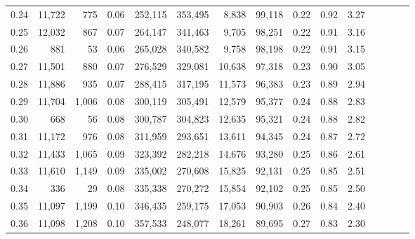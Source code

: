 \begin{tabular}{rrrcrrrrrrrrrrr}
0.24 &  11,722 &     775 &                                       0.06 &  252,115 &  353,495 &    8,838 &   99,118 &  0.22 &  0.92 &                         3.27 \\
0.25 &  12,032 &     867 &                                       0.07 &  264,147 &  341,463 &    9,705 &   98,251 &  0.22 &  0.91 &                         3.16 \\
0.26 &     881 &      53 &                                       0.06 &  265,028 &  340,582 &    9,758 &   98,198 &  0.22 &  0.91 &                         3.15 \\
0.27 &  11,501 &     880 &                                       0.07 &  276,529 &  329,081 &   10,638 &   97,318 &  0.23 &  0.90 &                         3.05 \\
0.28 &  11,886 &     935 &                                       0.07 &  288,415 &  317,195 &   11,573 &   96,383 &  0.23 &  0.89 &                         2.94 \\
0.29 &  11,704 &   1,006 &                                       0.08 &  300,119 &  305,491 &   12,579 &   95,377 &  0.24 &  0.88 &                         2.83 \\
0.30 &     668 &      56 &                                       0.08 &  300,787 &  304,823 &   12,635 &   95,321 &  0.24 &  0.88 &                         2.82 \\
0.31 &  11,172 &     976 &                                       0.08 &  311,959 &  293,651 &   13,611 &   94,345 &  0.24 &  0.87 &                         2.72 \\
0.32 &  11,433 &   1,065 &                                       0.09 &  323,392 &  282,218 &   14,676 &   93,280 &  0.25 &  0.86 &                         2.61 \\
0.33 &  11,610 &   1,149 &                                       0.09 &  335,002 &  270,608 &   15,825 &   92,131 &  0.25 &  0.85 &                         2.51 \\
0.34 &     336 &      29 &                                       0.08 &  335,338 &  270,272 &   15,854 &   92,102 &  0.25 &  0.85 &                         2.50 \\
0.35 &  11,097 &   1,199 &                                       0.10 &  346,435 &  259,175 &   17,053 &   90,903 &  0.26 &  0.84 &                         2.40 \\
0.36 &  11,098 &   1,208 &                                       0.10 &  357,533 &  248,077 &   18,261 &   89,695 &  0.27 &  0.83 &                         2.30 \\

\end{tabular}
